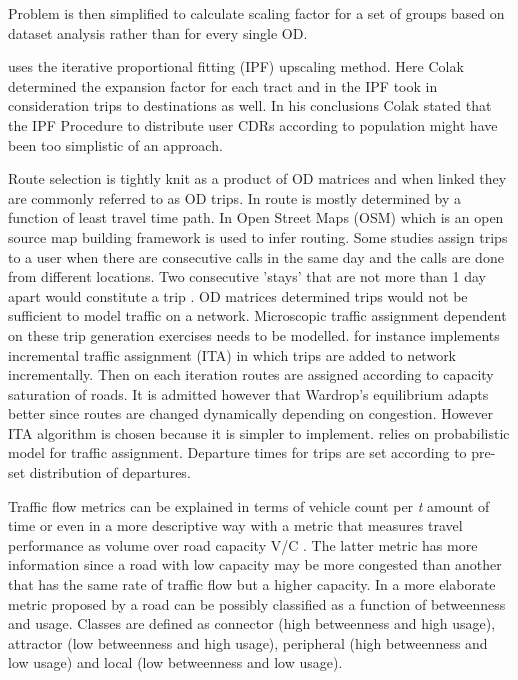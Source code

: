 \documentclass[12pt, a4paper]{report}
\theoremstyle{definition}
\theoremstyle{definition}%
\theoremstyle{definition}%
\theoremstyle{definition}%
\theoremstyle{definition}%
\theoremstyle{definition}%
\begin{document}
Problem is then simplified to calculate scaling factor for a set of groups based on dataset analysis rather than for every single OD.

\cite{Colak2015} uses the iterative proportional fitting (IPF) upscaling method. Here Colak determined the expansion factor for each tract and in the IPF took in consideration trips to destinations as well. In his conclusions Colak stated that the IPF Procedure to distribute user CDRs according to population might have been too simplistic of an approach.

Route selection is tightly knit as a product of OD matrices and when linked they are commonly referred to as OD trips. In \cite{Iqbal2014} route is mostly determined by a function of least travel time path. In \cite{Toole2015} Open Street Maps (OSM) which is an open source map building framework is used to infer routing. Some studies assign trips to a user when there are consecutive calls in the same day and the calls are done from different locations. Two consecutive 'stays' that are not more than 1 day apart would constitute a trip \cite{Colak2015,Toole2015}. OD matrices determined trips would not be sufficient to model traffic on a network. Microscopic traffic assignment dependent on these trip generation exercises needs to be modelled. \cite{Toole2015} for instance implements incremental traffic assignment (ITA) in which trips are added to network incrementally. Then on each iteration routes are assigned according to capacity saturation of roads. It is admitted however that Wardrop’s equilibrium  adapts better since routes are changed dynamically depending on congestion. However ITA algorithm is chosen because it is simpler to implement. \cite{Colak2015} relies on probabilistic model for traffic assignment. Departure times for trips are set according to pre-set distribution of departures.

Traffic flow metrics can be explained in terms of vehicle count per \textit{t} amount of time or even in a more descriptive way with a metric that measures travel performance as volume over road capacity V/C \cite{Toole2015}. The latter metric has more information since a road with low capacity may be more congested than another that has the same rate of traffic flow but a higher capacity. In a more elaborate metric proposed by \cite{Toole2015} a road can be possibly classified as a function of betweenness and usage. Classes are defined as connector (high betweenness and high usage), attractor (low betweenness and high usage), peripheral (high betweenness and low usage) and local (low betweenness and low usage).
\end{document}
